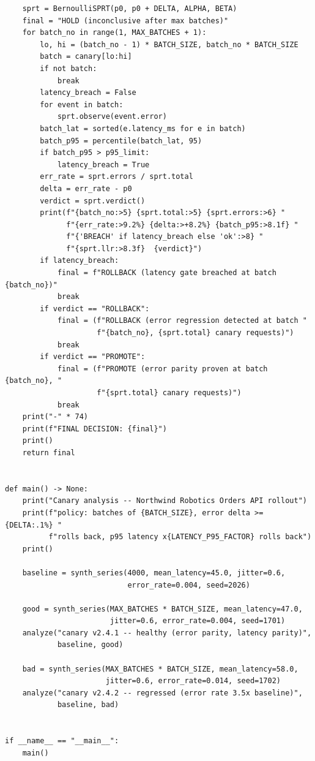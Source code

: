 \begin{verbatim}
    sprt = BernoulliSPRT(p0, p0 + DELTA, ALPHA, BETA)
    final = "HOLD (inconclusive after max batches)"
    for batch_no in range(1, MAX_BATCHES + 1):
        lo, hi = (batch_no - 1) * BATCH_SIZE, batch_no * BATCH_SIZE
        batch = canary[lo:hi]
        if not batch:
            break
        latency_breach = False
        for event in batch:
            sprt.observe(event.error)
        batch_lat = sorted(e.latency_ms for e in batch)
        batch_p95 = percentile(batch_lat, 95)
        if batch_p95 > p95_limit:
            latency_breach = True
        err_rate = sprt.errors / sprt.total
        delta = err_rate - p0
        verdict = sprt.verdict()
        print(f"{batch_no:>5} {sprt.total:>5} {sprt.errors:>6} "
              f"{err_rate:>9.2%} {delta:>+8.2%} {batch_p95:>8.1f} "
              f"{'BREACH' if latency_breach else 'ok':>8} "
              f"{sprt.llr:>8.3f}  {verdict}")
        if latency_breach:
            final = f"ROLLBACK (latency gate breached at batch {batch_no})"
            break
        if verdict == "ROLLBACK":
            final = (f"ROLLBACK (error regression detected at batch "
                     f"{batch_no}, {sprt.total} canary requests)")
            break
        if verdict == "PROMOTE":
            final = (f"PROMOTE (error parity proven at batch {batch_no}, "
                     f"{sprt.total} canary requests)")
            break
    print("-" * 74)
    print(f"FINAL DECISION: {final}")
    print()
    return final


def main() -> None:
    print("Canary analysis -- Northwind Robotics Orders API rollout")
    print(f"policy: batches of {BATCH_SIZE}, error delta >= {DELTA:.1%} "
          f"rolls back, p95 latency x{LATENCY_P95_FACTOR} rolls back")
    print()

    baseline = synth_series(4000, mean_latency=45.0, jitter=0.6,
                            error_rate=0.004, seed=2026)

    good = synth_series(MAX_BATCHES * BATCH_SIZE, mean_latency=47.0,
                        jitter=0.6, error_rate=0.004, seed=1701)
    analyze("canary v2.4.1 -- healthy (error parity, latency parity)",
            baseline, good)

    bad = synth_series(MAX_BATCHES * BATCH_SIZE, mean_latency=58.0,
                       jitter=0.6, error_rate=0.014, seed=1702)
    analyze("canary v2.4.2 -- regressed (error rate 3.5x baseline)",
            baseline, bad)


if __name__ == "__main__":
    main()
\end{verbatim}

